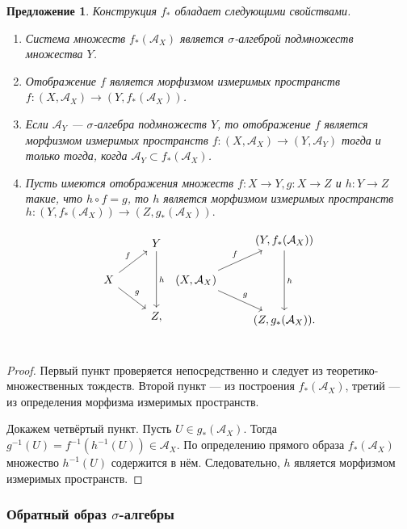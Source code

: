 \documentclass[12pt]{article}
\newtheorem{proposition}[theorem]{Предложение}
\numberwithin{theorem}{section}
\theoremstyle{definition}
\newcommand{\calA}{\mathcal{A}}
\begin{document}
	\begin{proposition} \label{direct image of sigma algebra}
		Конструкция $ f_{*} $ обладает следующими свойствами.
		\begin{enumerate}
			\item Система множеств $ f_{*}(\calA_X) $ является $ \sigma $-алгеброй подмножеств множества $ Y $.
			\item Отображение $ f $ является морфизмом измеримых пространств $ f \colon (X, \calA_X) \to (Y, f_{*}(\calA_X)) $.
			\item Если $ \calA_Y $ --- $ \sigma $-алгебра подмножеств $ Y $,
			то отображение $ f $ является морфизмом измеримых пространств $ f \colon (X, \calA_X) \to (Y, \calA_Y) $
			тогда и только тогда, когда $ \calA_Y \subset f_{*}(\calA_X) $.
			\item Пусть имеются отображения множеств $ f \colon X \to Y, g \colon X \to Z $ и $ h \colon Y \to Z $
			такие, что $ h \circ f = g $, то $ h $ является морфизмом измеримых пространств
			$ h \colon (Y, f_{*}(\calA_X)) \to (Z, g_{*}(\calA_X)). $
		\end{enumerate}
		$$ \begin{tikzcd}
			 & Y \ar{dd}{h} \\
			X \ar{ru}{f} \ar{rd}{g} &  \\
			& Z, \\
		\end{tikzcd} \
		\begin{tikzcd}
			& (Y, f_{*}(\calA_X)) \ar{dd}{h} \\
			(X, \calA_X) \ar{ru}{f} \ar{rd}{g} &  \\
			& (Z, g_{*}(\calA_X)). \\
		\end{tikzcd} $$
	\end{proposition}
	
	\begin{proof}
		Первый пункт проверяется непосредственно и следует из теоретико-множественных тождеств.
		Второй пункт --- из построения $ f_{*}(\calA_X) $, третий --- из определения морфизма измеримых пространств.
		
		Докажем четвёртый пункт. Пусть $ U \in g_*(\calA_X) $. Тогда $ g^{-1}(U) = f^{-1}(h^{-1}(U)) \in \calA_X $.
		По определению прямого образа $ f_*(\calA_X) $ множество $ h^{-1}(U) $ содержится в нём.
		Следовательно, $ h $ является морфизмом измеримых пространств.
	\end{proof}
	
	\subsubsection{Обратный образ $ \sigma $-алгебры}
	
\end{document}
